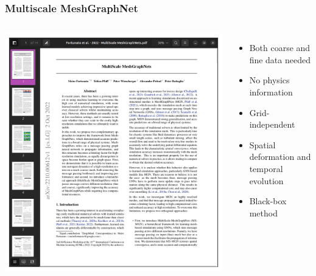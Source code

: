 \documentclass{beamer}
\begin{document}
\begin{frame}
    \frametitle{Multiscale MeshGraphNet}
\begin{columns}
\includegraphics[scale=0.13]{figures/MultiscaleMGN.png}
\begin{itemize}
    \item Both coarse and fine data needed
    \item No physics information
    \item Grid-independent
    \item Spatial deformation and temporal evolution
    \item Black-box method
\end{itemize}
\end{columns}
\end{frame}
\end{document}
